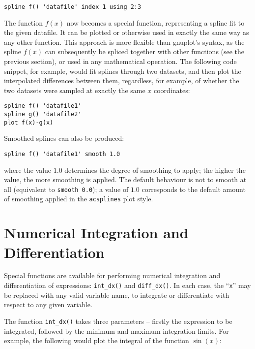 \documentclass[a4paper,onecolumn,11pt]{book}
\begin{document}
\begin{verbatim}
spline f() 'datafile' index 1 using 2:3
\end{verbatim}

The function $f(x)$ now becomes a special function, representing a spline fit
to the given datafile. It can be plotted or otherwise used in exactly the same
way as any other function. This approach is more flexible than gnuplot's
syntax, as the spline $f(x)$ can subsequently be spliced together with other
functions (see the previous section), or used in any mathematical operation.
The following code snippet, for example, would fit splines through two
datasets, and then plot the interpolated differences between them, regardless,
for example, of whether the two datasets were sampled at exactly the same $x$
coordinates:

\begin{verbatim}
spline f() 'datafile1'
spline g() 'datafile2'
plot f(x)-g(x)
\end{verbatim}

Smoothed splines can also be produced:

\begin{verbatim}
spline f() 'datafile1' smooth 1.0
\end{verbatim}

\noindent where the value $1.0$ determines the degree of smoothing to apply;
the higher the value, the more smoothing is applied. The default behaviour is
not to smooth at all (equivalent to \texttt{smooth 0.0}); a value of $1.0$
corresponds to the default amount of smoothing applied in the
\texttt{acsplines} plot style.

\section{Numerical Integration and Differentiation}

Special functions are available for performing numerical integration and
differentiation of expressions: \texttt{int\_dx()} and
\texttt{diff\_dx()}. In each case, the ``\texttt{x}'' may be
replaced with any valid variable name, to integrate or differentiate with
respect to any given variable.

The function \texttt{int\_dx()} takes three parameters -- firstly the
expression to be integrated, followed by the minimum and maximum integration
limits. For example, the following would plot the integral of the function
$\sin(x)$:
\end{document}
